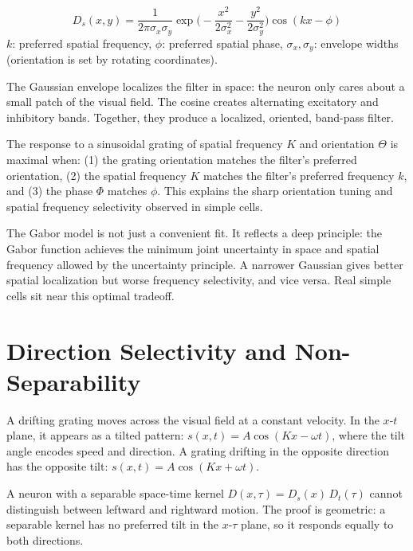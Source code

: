 \begin{keyequation}
\begin{equation}
  D_s(x, y) = \frac{1}{2\pi\sigma_x\sigma_y}
    \exp\!\biggl(-\frac{x^2}{2\sigma_x^2} - \frac{y^2}{2\sigma_y^2}\biggr)
    \cos(kx - \phi)
  \label{eq:gabor}
\end{equation}
\tcblower
$k$: preferred spatial frequency, \quad
$\phi$: preferred spatial phase, \quad
$\sigma_x, \sigma_y$: envelope widths (orientation is set by rotating coordinates).
\end{keyequation}

\noindent The Gaussian envelope localizes the filter in space: the neuron only cares about a small patch of the visual field. The cosine creates alternating excitatory and inhibitory bands. Together, they produce a localized, oriented, band-pass filter.

The response to a sinusoidal grating of spatial frequency $K$ and orientation $\Theta$ is maximal when: (1) the grating orientation matches the filter's preferred orientation, (2) the spatial frequency $K$ matches the filter's preferred frequency $k$, and (3) the phase $\Phi$ matches $\phi$. This explains the sharp orientation tuning and spatial frequency selectivity observed in simple cells.

The Gabor model is not just a convenient fit. It reflects a deep principle: the Gabor function achieves the minimum joint uncertainty in space and spatial frequency allowed by the uncertainty principle. A narrower Gaussian gives better spatial localization but worse frequency selectivity, and vice versa. Real simple cells sit near this optimal tradeoff.

\section{Direction Selectivity and Non-Separability}
\label{sec:direction}

A drifting grating moves across the visual field at a constant velocity. In the $x$-$t$ plane, it appears as a tilted pattern: $s(x, t) = A\cos(Kx - \omega t)$, where the tilt angle encodes speed and direction. A grating drifting in the opposite direction has the opposite tilt: $s(x, t) = A\cos(Kx + \omega t)$.

A neuron with a separable space-time kernel $D(x, \tau) = D_s(x)\,D_t(\tau)$ cannot distinguish between leftward and rightward motion. The proof is geometric: a separable kernel has no preferred tilt in the $x$-$\tau$ plane, so it responds equally to both directions.

